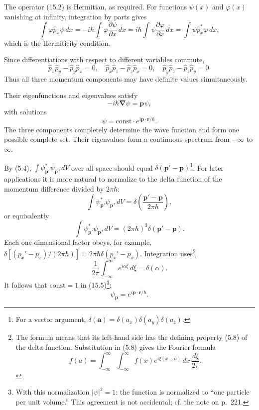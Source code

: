 The operator (15.2) is Hermitian, as required. For functions $\psi(x)$ and
$\varphi(x)$ vanishing at infinity, integration by parts gives
\[
 \int\varphi\hat p_x\psi\,dx
 =-i\hbar\int\varphi\frac{\partial\psi}{\partial x}\,dx
 =i\hbar\int\psi\frac{\partial\varphi}{\partial x}\,dx
 =\int\psi\hat p_x^*\varphi\,dx,
\]
which is the Hermiticity condition.

Since differentiations with respect to different variables commute,
\begin{equation}
 \hat p_x\hat p_y-\hat p_y\hat p_x=0,\quad
 \hat p_x\hat p_z-\hat p_z\hat p_x=0,\quad
 \hat p_y\hat p_z-\hat p_z\hat p_y=0.
 \tag{15.3}
\end{equation}
Thus all three momentum components may have definite values simultaneously.

Their eigenfunctions and eigenvalues satisfy
\begin{equation}
 -i\hbar\boldsymbol\nabla\psi=\mathbf p\psi,
 \tag{15.4}
\end{equation}
with solutions
\begin{equation}
 \psi=\mathrm{const}\cdot e^{i\mathbf p\cdot\mathbf r/\hbar}.
 \tag{15.5}
\end{equation}
The three components completely determine the wave function and form one
possible complete set. Their eigenvalues form a continuous spectrum from
$-\infty$ to $\infty$.

By (5.4), $\int\psi_{\mathbf p'}^*\psi_{\mathbf p},dV$ over all space should
equal $\delta(\mathbf p'-\mathbf p)$\footnote{For a vector argument,
$\delta(\mathbf a)=\delta(a_x)\delta(a_y)\delta(a_z)$.}. For later applications
it is more natural to normalize to the delta function of the momentum
difference divided by $2\pi\hbar$:
\[
 \int\psi_{\mathbf p'}^*\psi_{\mathbf p},dV
 =\delta\left(\frac{\mathbf p'-\mathbf p}{2\pi\hbar}\right),
\]
or equivalently
\begin{equation}
 \int\psi_{\mathbf p'}^*\psi_{\mathbf p},dV
 =(2\pi\hbar)^3\delta(\mathbf p'-\mathbf p).
 \tag{15.6}
\end{equation}
Each one-dimensional factor obeys, for example,
$\delta[(p_x'-p_x)/(2\pi\hbar)]=2\pi\hbar\delta(p_x'-p_x)$.
Integration uses\footnote{The formula means that its left-hand side has the
defining property (5.8) of the delta function. Substitution in (5.8) gives the
Fourier formula
\[
 f(a)=\int_{-\infty}^{\infty}\int_{-\infty}^{\infty}
 f(x)e^{i\xi(x-a)}\,dx\,\frac{d\xi}{2\pi}.
\]}
\begin{equation}
 \frac{1}{2\pi}\int_{-\infty}^{\infty}e^{i\alpha\xi}\,d\xi=\delta(\alpha).
 \tag{15.7}
\end{equation}
It follows that $\mathrm{const}=1$ in (15.5)\footnote{With this normalization
$|\psi|^2=1$: the function is normalized to ``one particle per unit volume.''
This agreement is not accidental; cf. the note on p.~221.}:
\begin{equation}
 \psi_{\mathbf p}=e^{i\mathbf p\cdot\mathbf r/\hbar}.
 \tag{15.8}
\end{equation}


